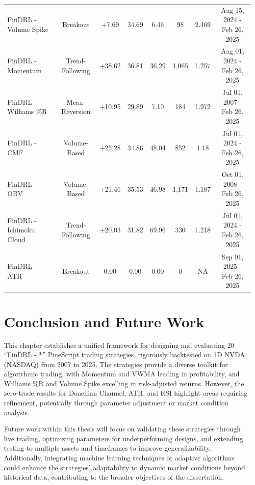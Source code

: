 \begin{table}[h]
\begin{tabular}{|l|c|c|c|c|c|c|c|}
FinDRL - Volume Spike     & Breakout        & +7.69           & 34.69        & 6.46               & 98     & 2.469         & Aug 15, 2024 - Feb 26, 2025\\
FinDRL - Momentum         & Trend-Following & +38.62          & 36.81        & 36.29              & 1,065  & 1.257         & Aug 01, 2024 - Feb 26, 2025\\
FinDRL - Williams \%R     & Mean-Reversion  & +10.95          & 29.89        & 7.10               & 184    & 1.972         & Jul 01, 2007 - Feb 26, 2025\\
FinDRL - CMF              & Volume-Based    & +25.28          & 34.86        & 48.04              & 852    & 1.18          & Jul 01, 2024 - Feb 26, 2025\\
FinDRL - OBV              & Volume-Based    & +21.46          & 35.53        & 46.98              & 1,171  & 1.187         & Oct 01, 2008 - Feb 26, 2025\\
FinDRL - Ichimoku Cloud   & Trend-Following & +20.03          & 31.82        & 69.96              & 330    & 1.218         & Jul 01, 2024 - Feb 26, 2025\\
FinDRL - ATR              & Breakout        & 0.00            & 0.00         & 0.00               & 0      & NA            & Sep 01, 2025 - Feb 26, 2025 \\
\bottomrule
\end{tabular}
\end{table}

\section{Conclusion and Future Work}
This chapter establishes a unified framework for designing and evaluating 20 “FinDRL - *” PineScript trading strategies, rigorously backtested on 1D NVDA (NASDAQ) from 2007 to 2025. The strategies provide a diverse toolkit for algorithmic trading, with Momentum and VWMA leading in profitability, and Williams \%R and Volume Spike excelling in risk-adjusted returns. However, the zero-trade results for Donchian Channel, ATR, and RSI highlight areas requiring refinement, potentially through parameter adjustment or market condition analysis.

Future work within this thesis will focus on validating these strategies through live trading, optimizing parameters for underperforming designs, and extending testing to multiple assets and timeframes to improve generalizability. Additionally, integrating machine learning techniques or adaptive algorithms could enhance the strategies’ adaptability to dynamic market conditions beyond historical data, contributing to the broader objectives of the dissertation.
